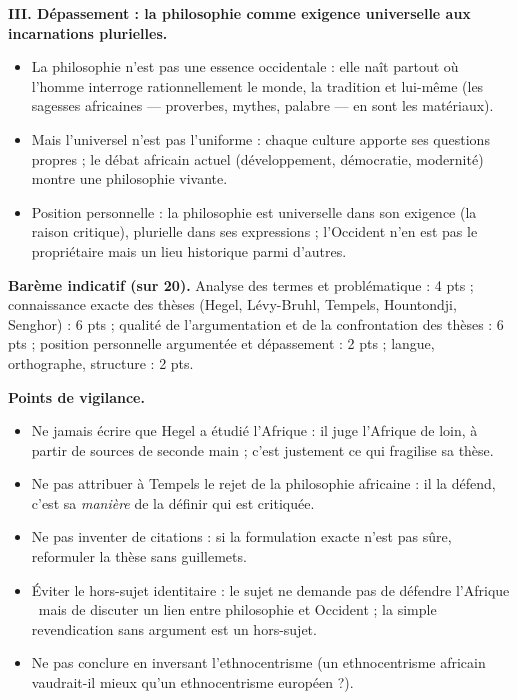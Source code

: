 \documentclass[11pt]{article}
\begin{document}
\begin{corrige}
\textbf{III. Dépassement : la philosophie comme exigence universelle aux incarnations plurielles.}
\begin{itemize}
\item La philosophie n'est pas une essence occidentale : elle naît partout où l'homme interroge rationnellement le monde, la tradition et lui-même (les sagesses africaines — proverbes, mythes, palabre — en sont les matériaux).
\item Mais l'universel n'est pas l'uniforme : chaque culture apporte ses questions propres ; le débat africain actuel (développement, démocratie, modernité) montre une philosophie vivante.
\item Position personnelle : la philosophie est universelle dans son exigence (la raison critique), plurielle dans ses expressions ; l'Occident n'en est pas le propriétaire mais un lieu historique parmi d'autres.
\end{itemize}

\textbf{Barème indicatif (sur 20).} Analyse des termes et problématique : 4 pts ; connaissance exacte des thèses (Hegel, Lévy-Bruhl, Tempels, Hountondji, Senghor) : 6 pts ; qualité de l'argumentation et de la confrontation des thèses : 6 pts ; position personnelle argumentée et dépassement : 2 pts ; langue, orthographe, structure : 2 pts.

\textbf{Points de vigilance.}
\begin{itemize}
\item Ne jamais écrire que Hegel \guillemotleft a étudié l'Afrique \guillemotright : il juge l'Afrique de loin, à partir de sources de seconde main ; c'est justement ce qui fragilise sa thèse.
\item Ne pas attribuer à Tempels le rejet de la philosophie africaine : il la défend, c'est sa \emph{manière} de la définir qui est critiquée.
\item Ne pas inventer de citations : si la formulation exacte n'est pas sûre, reformuler la thèse sans guillemets.
\item Éviter le hors-sujet identitaire : le sujet ne demande pas de \guillemotleft défendre l'Afrique \guillemotright\ mais de discuter un lien entre philosophie et Occident ; la simple revendication sans argument est un hors-sujet.
\item Ne pas conclure en inversant l'ethnocentrisme (un ethnocentrisme africain vaudrait-il mieux qu'un ethnocentrisme européen ?).
\end{itemize}

\end{corrige}
\end{document}
